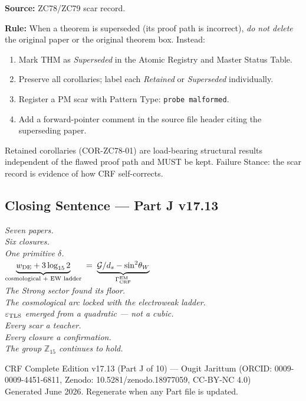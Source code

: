 \documentclass[12pt, a4paper]{article}
\begin{document}
\begin{keybox}[title={PWA-11 (NEW v17.13): Superseded-Theorem
  Retention Rule}]
\textbf{Source:} ZC78/ZC79 scar record.

\textbf{Rule:} When a theorem is superseded (its proof path is
incorrect), \emph{do not delete} the original paper or the
original theorem box. Instead:
\begin{enumerate}[leftmargin=2em, noitemsep]
  \item Mark THM as \textit{Superseded} in the Atomic Registry
    and Master Status Table.
  \item Preserve all corollaries; label each
    \textit{Retained} or \textit{Superseded} individually.
  \item Register a PM scar with Pattern Type:
    \texttt{probe malformed}.
  \item Add a forward-pointer comment in the source file header
    citing the superseding paper.
\end{enumerate}
Retained corollaries (COR-ZC78-01) are load-bearing structural
results independent of the flawed proof path and MUST be kept.
Failure Stance: the scar record is evidence of how CRF self-corrects.
\end{keybox}

\subsection{Closing Sentence --- Part J v17.13}

\bigskip
\begin{center}
\textit{%
  Seven papers.\\[0.3em]
  Six closures.\\[0.3em]
  One primitive $\delta$.\\[0.5em]
  $\displaystyle
    \underbrace{w_{\rm DE} + 3\log_{15}2}_{\text{cosmological + EW ladder}}
    \;=\;
    \underbrace{\mathcal{G}/d_s - \sin^2\!\theta_W}_{\Gamma_{\rm CRF}^{\rm EM}}
  $\\[0.5em]
  The Strong sector found its floor.\\[0.3em]
  The cosmological arc locked with the electroweak ladder.\\[0.3em]
  $\varepsilon_{\rm TLS}$ emerged from a quadratic --- not a cubic.\\[0.5em]
  Every scar a teacher.\\[0.3em]
  Every closure a confirmation.\\[0.3em]
  The group $\mathbb{Z}_{15}$ continues to hold.
}
\end{center}

\bigskip
\begin{center}
\small\color{mutedgray}
CRF Complete Edition v17.13 (Part J of 10) ---
Ougit Jarittum (ORCID: 0009-0009-4451-6811,
Zenodo: 10.5281/zenodo.18977059, CC-BY-NC 4.0)\\
Generated June 2026. Regenerate when any Part file is updated.
\end{center}
\end{document}
